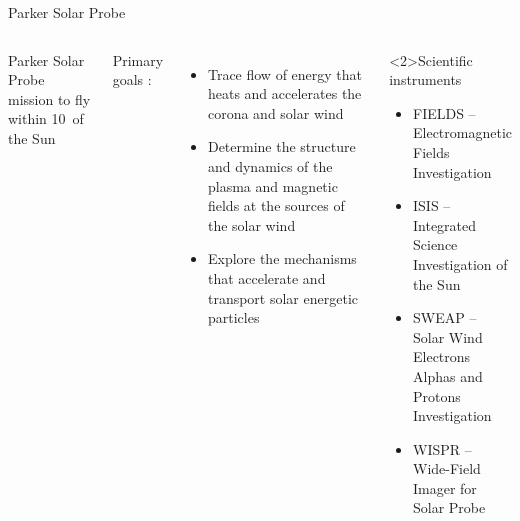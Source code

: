 \begin{frame}[plain,c]{Parker Solar Probe}{}
	\begin{columns}[c]
	\column{\textwidth}
		
		Parker Solar Probe mission to fly within 10\,\Rs{} of the Sun\\\ 
		
		Primary goals \citep{Fox2015}:
		\begin{itemize}
			\item Trace flow of energy that heats and accelerates the corona and solar wind
			\item Determine the structure and dynamics of the plasma and magnetic fields at the sources of the solar wind
			\item Explore the mechanisms that accelerate and transport solar energetic particles
		\end{itemize}
		\vspace{5mm}
		\begin{block}<2>{Scientific instruments}
			\begin{itemize}
				\item FIELDS -- Electromagnetic Fields Investigation
				\item IS\sun{}IS -- Integrated Science Investigation of the Sun
				\item SWEAP -- Solar Wind Electrons Alphas and Protons Investigation
				\item WISPR -- Wide-Field Imager for Solar Probe
			\end{itemize}
		\end{block}

	\end{columns}
\end{frame}
